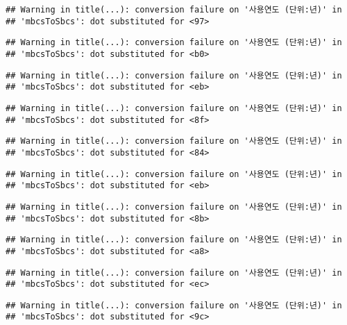 \documentclass[
]{article}
\begin{document}
\begin{verbatim}
## Warning in title(...): conversion failure on '사용연도 (단위:년)' in
## 'mbcsToSbcs': dot substituted for <97>
\end{verbatim}

\begin{verbatim}
## Warning in title(...): conversion failure on '사용연도 (단위:년)' in
## 'mbcsToSbcs': dot substituted for <b0>
\end{verbatim}

\begin{verbatim}
## Warning in title(...): conversion failure on '사용연도 (단위:년)' in
## 'mbcsToSbcs': dot substituted for <eb>
\end{verbatim}

\begin{verbatim}
## Warning in title(...): conversion failure on '사용연도 (단위:년)' in
## 'mbcsToSbcs': dot substituted for <8f>
\end{verbatim}

\begin{verbatim}
## Warning in title(...): conversion failure on '사용연도 (단위:년)' in
## 'mbcsToSbcs': dot substituted for <84>
\end{verbatim}

\begin{verbatim}
## Warning in title(...): conversion failure on '사용연도 (단위:년)' in
## 'mbcsToSbcs': dot substituted for <eb>
\end{verbatim}

\begin{verbatim}
## Warning in title(...): conversion failure on '사용연도 (단위:년)' in
## 'mbcsToSbcs': dot substituted for <8b>
\end{verbatim}

\begin{verbatim}
## Warning in title(...): conversion failure on '사용연도 (단위:년)' in
## 'mbcsToSbcs': dot substituted for <a8>
\end{verbatim}

\begin{verbatim}
## Warning in title(...): conversion failure on '사용연도 (단위:년)' in
## 'mbcsToSbcs': dot substituted for <ec>
\end{verbatim}

\begin{verbatim}
## Warning in title(...): conversion failure on '사용연도 (단위:년)' in
## 'mbcsToSbcs': dot substituted for <9c>
\end{verbatim}
\end{document}
